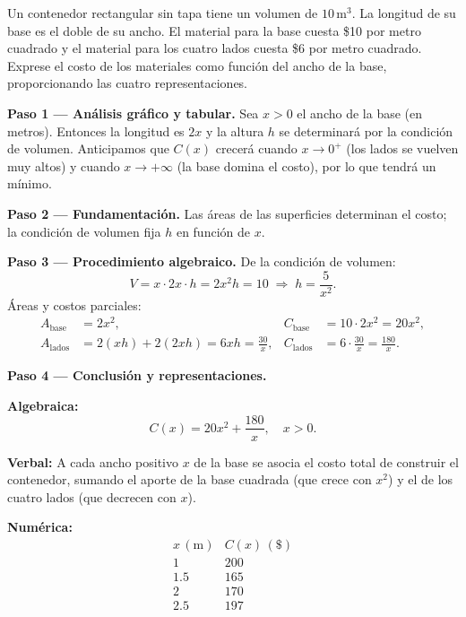 \begin{example}\label{ex:costo-contenedor}
Un contenedor rectangular sin tapa tiene un volumen de $10\,\mathrm{m}^3$. La longitud de su base es el doble de su ancho. El material para la base cuesta \$10 por metro cuadrado y el material para los cuatro lados cuesta \$6 por metro cuadrado. Exprese el costo de los materiales como función del ancho de la base, proporcionando las cuatro representaciones.

\begin{myproof}
\textbf{Paso 1 — Análisis gráfico y tabular.} Sea $x > 0$ el ancho de la base (en metros). Entonces la longitud es $2x$ y la altura $h$ se determinará por la condición de volumen. Anticipamos que $C(x)$ crecerá cuando $x \to 0^+$ (los lados se vuelven muy altos) y cuando $x \to +\infty$ (la base domina el costo), por lo que tendrá un mínimo.

\textbf{Paso 2 — Fundamentación.} Las áreas de las superficies determinan el costo; la condición de volumen fija $h$ en función de $x$.

\textbf{Paso 3 — Procedimiento algebraico.} De la condición de volumen:
\[
  V = x \cdot 2x \cdot h = 2x^2 h = 10 \;\Rightarrow\; h = \frac{5}{x^2}.
\]
Áreas y costos parciales:
\begin{align*}
  A_{\text{base}} &= 2x^2, & C_{\text{base}} &= 10 \cdot 2x^2 = 20x^2,\\
  A_{\text{lados}} &= 2(xh) + 2(2xh) = 6xh = \frac{30}{x}, & C_{\text{lados}} &= 6 \cdot \frac{30}{x} = \frac{180}{x}.
\end{align*}

\textbf{Paso 4 — Conclusión y representaciones.}

\textbf{Algebraica:}
\[
  \boxed{C(x) = 20x^2 + \frac{180}{x},\quad x > 0.}
\]

\textbf{Verbal:} A cada ancho positivo $x$ de la base se asocia el costo total de construir el contenedor, sumando el aporte de la base cuadrada (que crece con $x^2$) y el de los cuatro lados (que decrecen con $x$).

\textbf{Numérica:}
\[
\begin{array}{c|c}
x\,(\mathrm{m}) & C(x)\,(\$) \\\hline
1   & 200 \\
1.5 & 165 \\
2   & 170 \\
2.5 & 197 \\
\end{array}
\]


\end{myproof}
\end{example}

